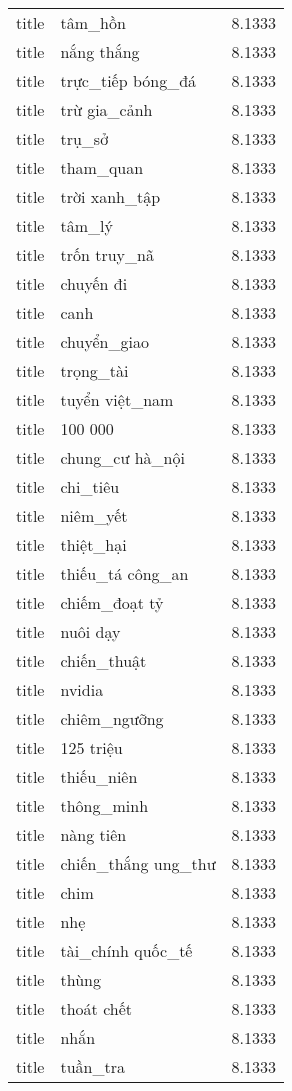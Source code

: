 \documentclass{article}
\begin{document}
\begin{tabular}{lll}
title & tâm\_hồn & 8.1333\\
title & nắng thắng & 8.1333\\
title & trực\_tiếp bóng\_đá & 8.1333\\
title & trừ gia\_cảnh & 8.1333\\
title & trụ\_sở & 8.1333\\
title & tham\_quan & 8.1333\\
title & trời xanh\_tập & 8.1333\\
title & tâm\_lý & 8.1333\\
title & trốn truy\_nã & 8.1333\\
title & chuyến đi & 8.1333\\
title & canh & 8.1333\\
title & chuyển\_giao & 8.1333\\
title & trọng\_tài & 8.1333\\
title & tuyển việt\_nam & 8.1333\\
title & 100 000 & 8.1333\\
title & chung\_cư hà\_nội & 8.1333\\
title & chi\_tiêu & 8.1333\\
title & niêm\_yết & 8.1333\\
title & thiệt\_hại & 8.1333\\
title & thiếu\_tá công\_an & 8.1333\\
title & chiếm\_đoạt tỷ & 8.1333\\
title & nuôi dạy & 8.1333\\
title & chiến\_thuật & 8.1333\\
title & nvidia & 8.1333\\
title & chiêm\_ngưỡng & 8.1333\\
title & 125 triệu & 8.1333\\
title & thiếu\_niên & 8.1333\\
title & thông\_minh & 8.1333\\
title & nàng tiên & 8.1333\\
title & chiến\_thắng ung\_thư & 8.1333\\
title & chim & 8.1333\\
title & nhẹ & 8.1333\\
title & tài\_chính quốc\_tế & 8.1333\\
title & thùng & 8.1333\\
title & thoát chết & 8.1333\\
title & nhắn & 8.1333\\
title & tuần\_tra & 8.1333\\

\end{tabular}
\end{document}
